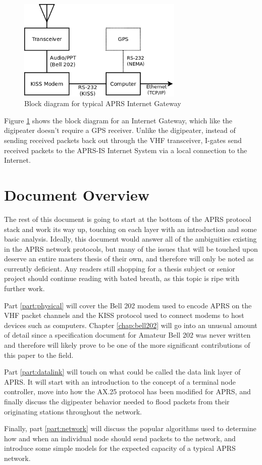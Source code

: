 \begin{figure}
	\centering
	\includegraphics[width=0.7\textwidth]{src/dia/igate_kiss}
	\caption{Block diagram for typical APRS Internet Gateway}
	\label{fig:blockigate}
\end{figure}

Figure \ref{fig:blockigate} shows the block diagram for an Internet Gateway, which
like the digipeater doesn't require a GPS receiver. Unlike the digipeater,
instead of sending received packets back out through the VHF transceiver,
I-gates send received packets to the APRS-IS Internet System via a local connection
to the Internet.


\section{Document Overview}

The rest of this document is going to start at the bottom of the APRS protocol
stack and work its way up, touching on each layer with an introduction and
some basic analysis. 
Ideally, this document would answer all of the ambiguities existing in the
APRS network protocols, but many of the issues that will be touched upon 
deserve an entire masters thesis of their own, and therefore will only
be noted as currently deficient. 
Any readers still shopping for a thesis subject or senior project should 
continue reading with bated breath, as this topic is ripe with further 
work.

Part \ref{part:physical} will cover the Bell 202 modem used to encode APRS on
the VHF packet channels and the KISS protocol used to connect modems to
host devices such as computers. Chapter \ref{chap:bell202} will go into an
unusual amount of detail since a specification document for Amateur Bell 202
was never written and therefore will likely prove to be one of the more significant
contributions of this paper to the field.

Part \ref{part:datalink} will touch on what could be called the data link layer
of APRS. It will start with an introduction to the concept of a terminal
node controller, move into how the AX.25 protocol has been modified for APRS, and
finally discuss the digipeater behavior needed to flood packets from their
originating stations throughout the network.

Finally, part \ref{part:network} will discuss the popular algorithms used to 
determine how and when an individual node should send packets to the network,
and introduce some simple models for the 
expected capacity of a typical APRS network.

